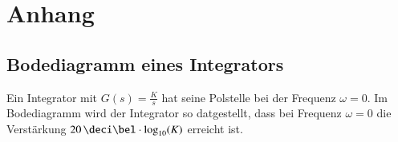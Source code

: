 \section{Anhang}

\subsection{Bodediagramm eines Integrators}

Ein Integrator mit $G(s) = \frac{K}{s}$ hat seine Polstelle bei der Frequenz $\omega = 0$. Im Bodediagramm wird der Integrator so
datgestellt, dass bei Frequenz $\omega = 0$ die Verstärkung $20 \, \deci \bel \cdot \log_{10}(K)$ erreicht ist.

